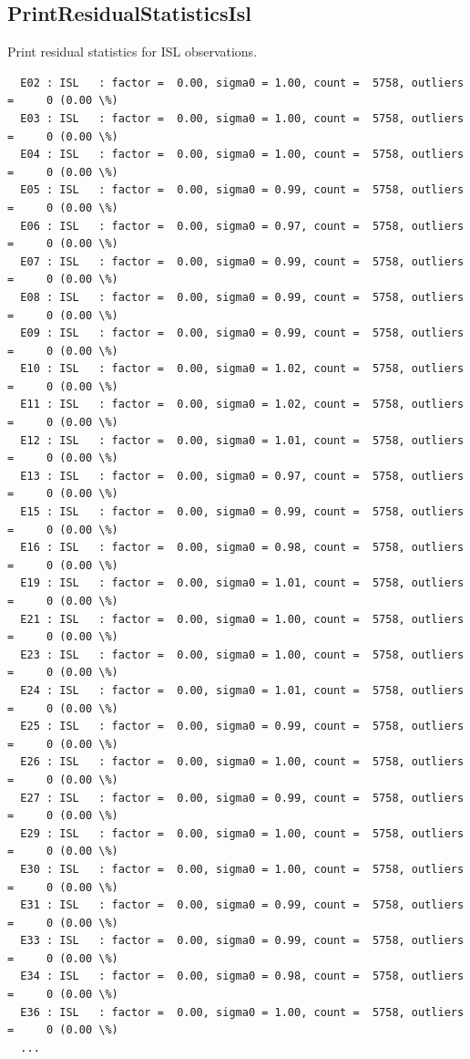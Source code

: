 \subsection{PrintResidualStatisticsIsl}\label{gnssProcessingStepType:PrintResidualStatisticsIsl}
Print residual statistics for ISL observations.
\begin{verbatim}
  E02 : ISL   : factor =  0.00, sigma0 = 1.00, count =  5758, outliers =     0 (0.00 \%)
  E03 : ISL   : factor =  0.00, sigma0 = 1.00, count =  5758, outliers =     0 (0.00 \%)
  E04 : ISL   : factor =  0.00, sigma0 = 1.00, count =  5758, outliers =     0 (0.00 \%)
  E05 : ISL   : factor =  0.00, sigma0 = 0.99, count =  5758, outliers =     0 (0.00 \%)
  E06 : ISL   : factor =  0.00, sigma0 = 0.97, count =  5758, outliers =     0 (0.00 \%)
  E07 : ISL   : factor =  0.00, sigma0 = 0.99, count =  5758, outliers =     0 (0.00 \%)
  E08 : ISL   : factor =  0.00, sigma0 = 0.99, count =  5758, outliers =     0 (0.00 \%)
  E09 : ISL   : factor =  0.00, sigma0 = 0.99, count =  5758, outliers =     0 (0.00 \%)
  E10 : ISL   : factor =  0.00, sigma0 = 1.02, count =  5758, outliers =     0 (0.00 \%)
  E11 : ISL   : factor =  0.00, sigma0 = 1.02, count =  5758, outliers =     0 (0.00 \%)
  E12 : ISL   : factor =  0.00, sigma0 = 1.01, count =  5758, outliers =     0 (0.00 \%)
  E13 : ISL   : factor =  0.00, sigma0 = 0.97, count =  5758, outliers =     0 (0.00 \%)
  E15 : ISL   : factor =  0.00, sigma0 = 0.99, count =  5758, outliers =     0 (0.00 \%)
  E16 : ISL   : factor =  0.00, sigma0 = 0.98, count =  5758, outliers =     0 (0.00 \%)
  E19 : ISL   : factor =  0.00, sigma0 = 1.01, count =  5758, outliers =     0 (0.00 \%)
  E21 : ISL   : factor =  0.00, sigma0 = 1.00, count =  5758, outliers =     0 (0.00 \%)
  E23 : ISL   : factor =  0.00, sigma0 = 1.00, count =  5758, outliers =     0 (0.00 \%)
  E24 : ISL   : factor =  0.00, sigma0 = 1.01, count =  5758, outliers =     0 (0.00 \%)
  E25 : ISL   : factor =  0.00, sigma0 = 0.99, count =  5758, outliers =     0 (0.00 \%)
  E26 : ISL   : factor =  0.00, sigma0 = 1.00, count =  5758, outliers =     0 (0.00 \%)
  E27 : ISL   : factor =  0.00, sigma0 = 0.99, count =  5758, outliers =     0 (0.00 \%)
  E29 : ISL   : factor =  0.00, sigma0 = 1.00, count =  5758, outliers =     0 (0.00 \%)
  E30 : ISL   : factor =  0.00, sigma0 = 1.00, count =  5758, outliers =     0 (0.00 \%)
  E31 : ISL   : factor =  0.00, sigma0 = 0.99, count =  5758, outliers =     0 (0.00 \%)
  E33 : ISL   : factor =  0.00, sigma0 = 0.99, count =  5758, outliers =     0 (0.00 \%)
  E34 : ISL   : factor =  0.00, sigma0 = 0.98, count =  5758, outliers =     0 (0.00 \%)
  E36 : ISL   : factor =  0.00, sigma0 = 1.00, count =  5758, outliers =     0 (0.00 \%)
  ...
\end{verbatim}


